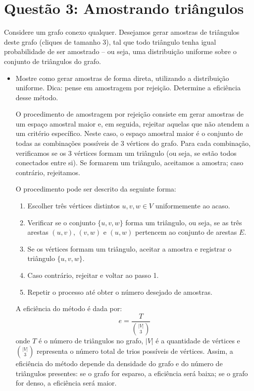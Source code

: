 \section*{Questão 3: Amostrando triângulos}

Considere um grafo conexo qualquer. Desejamos gerar amostras de triângulos deste grafo (cliques de tamanho 3), tal que todo triângulo tenha igual probabilidade de ser amostrado -- ou seja, uma distribuição uniforme sobre o conjunto de triângulos do grafo.

\begin{itemize}
  \item Mostre como gerar amostras de forma direta, utilizando a distribuição uniforme. Dica: pense em amostragem por rejeição. Determine a eficiência desse método.
\begin{resposta}
  O procedimento de amostragem por rejeição consiste em gerar amostras de um espaço amostral maior e, em seguida, rejeitar aquelas que não atendem a um critério específico. Neste caso, o espaço amostral maior é o conjunto de todas as combinações possíveis de 3 vértices do grafo. Para cada combinação, verificamos se os 3 vértices formam um triângulo (ou seja, se estão todos conectados entre si). Se formarem um triângulo, aceitamos a amostra; caso contrário, rejeitamos.

  O procedimento pode ser descrito da seguinte forma:
  \begin{enumerate}
    \item Escolher três vértices distintos $u, v, w \in V$ uniformemente ao acaso.
    
    \item Verificar se o conjunto $\{u, v, w\}$ forma um triângulo, ou seja, se as três arestas $(u, v)$, $(v, w)$ e $(u, w)$ pertencem ao conjunto de arestas $E$.

    \item Se os vértices formam um triângulo, aceitar a amostra e registrar o triângulo $\{u, v, w\}$.

    \item Caso contrário, rejeitar e voltar ao passo 1.

    \item Repetir o processo até obter o número desejado de amostras.
  \end{enumerate}

  A eficiência do método é dada por:
  $$
  e = \frac{T}{\binom{|V|}{3}}
  $$
  onde $T$ é o número de triângulos no grafo, $|V|$ é a quantidade de vértices e $\binom{|V|}{3}$ representa o número total de trios possíveis de vértices. Assim, a eficiência do método depende da densidade do grafo e do número de triângulos presentes: se o grafo for esparso, a eficiência será baixa; se o grafo for denso, a eficiência será maior.
\end{resposta}


\end{itemize}
